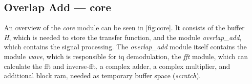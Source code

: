 \documentclass[12pt,a4paper,parskip=full,abstract=true,BCOR=12mm]{scrreprt}
\def\device#1{\mbox{\textit{#1}}}
\begin{document}

\subsection[Overlap Add]{Overlap Add --- core}
\label{sec:overlap_add}

An overview of the \device{core} module can be seen in \cref{fig:core}.
It consists of the buffer \device{H}, which is needed to store the transfer
function, and the module \device{overlap\_add}, which contains the signal
processing. The \device{overlap\_add}
module itself contains the module \device{wave}, which is responsible for \gls{iq}
demodulation, the \device{fft} module, which can calculate the \gls{fft} and
inverse-\gls{fft}, a complex adder, a complex multiplier, and additional block
\gls{ram}, needed as temporary buffer space (\device{scratch}).
\end{document}
